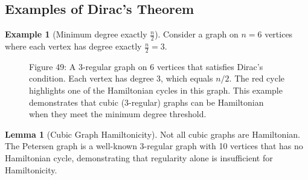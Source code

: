 \documentclass{article}
\theoremstyle{definition}
\newtheorem{example}{Example}
\newtheorem{lemma}{Lemma}
\begin{document}
\subsection{Examples of Dirac's Theorem}
\begin{example}[Minimum degree exactly $\frac{n}{2}$]
Consider a graph on $n = 6$ vertices where each vertex has degree exactly $\frac{n}{2} = 3$.
\end{example}
\begin{figure}[h!]
\begin{center}
\end{center}

\begin{center}
\small Figure 49: A 3-regular graph on 6 vertices that satisfies Dirac's condition. Each vertex has degree 3, which equals $n/2$. The red cycle highlights one of the Hamiltonian cycles in this graph. This example demonstrates that cubic (3-regular) graphs can be Hamiltonian when they meet the minimum degree threshold.
\end{center}
\end{figure}
\begin{lemma}[Cubic Graph Hamiltonicity]
Not all cubic graphs are Hamiltonian. The Petersen graph is a well-known 3-regular graph with 10 vertices that has no Hamiltonian cycle, demonstrating that regularity alone is insufficient for Hamiltonicity.
\end{lemma}
\newpage
\end{document}
